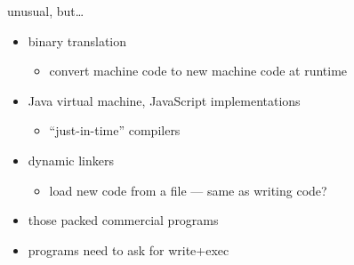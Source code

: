 \begin{frame}{unusual, but\ldots}
    \begin{itemize}
    \item binary translation
        \begin{itemize}
        \item convert machine code to new machine code at runtime
        \end{itemize}
    \item Java virtual machine, JavaScript implementations
        \begin{itemize}
        \item ``just-in-time'' compilers
        \end{itemize}
    \item dynamic linkers
        \begin{itemize}
        \item load new code from a file --- same as writing code?
        \end{itemize}
    \item those packed commercial programs
    \vspace{.5cm}
    \item programs need to  ask for write+exec
    \end{itemize}
\end{frame}
